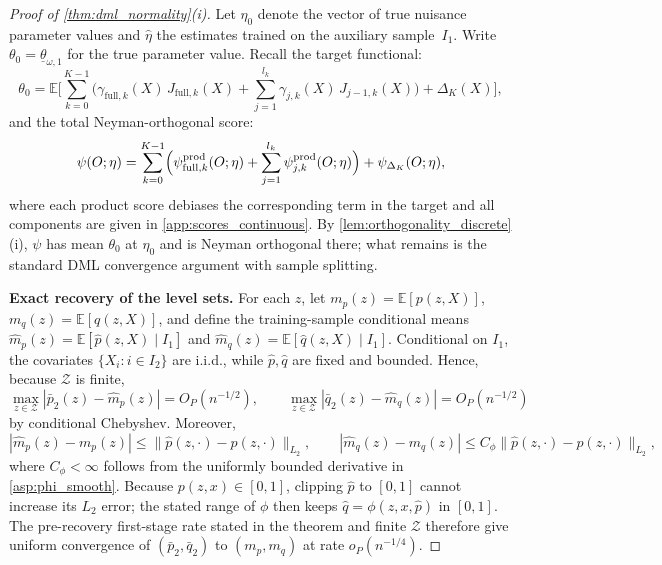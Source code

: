 \begin{proof}[Proof of \cref{thm:dml_normality}\textup{(i)}]
Let $\eta_0$ denote the vector of true nuisance parameter values and $\hat{\eta}$ the estimates trained on the auxiliary sample~$I_1$. Write $\theta_0 = \underline{\theta}_{\omega,1}$ for the true parameter value. Recall the target functional:
\begin{equation*}
    \theta_0 = \mathbb{E}\Bigg[\sum_{k=0}^{K-1}\bigg(\gamma_{\mathrm{full},k}(X)\,J_{\mathrm{full},k}(X) + \sum_{j=1}^{l_k} \gamma_{j,k}(X)\,J_{j-1,k}(X)\bigg) + \Delta_K(X)\Bigg],
\end{equation*}
and the total Neyman-orthogonal score:
\begin{equation*}
    \psi(O;\eta) = \sum_{k=0}^{K-1}\Bigl(\psi_{\mathrm{full},k}^{\mathrm{prod}}(O;\eta) + \sum_{j=1}^{l_k}\psi_{j,k}^{\mathrm{prod}}(O;\eta)\Bigr) + \psi_{\Delta_K}(O;\eta),
\end{equation*}
where each product score debiases the corresponding term in the target and all components are given in \cref{app:scores_continuous}. By \cref{lem:orthogonality_discrete}\textup{(i)}, $\psi$ has mean $\theta_0$ at $\eta_0$ and is Neyman orthogonal there; what remains is the standard DML convergence argument with sample splitting.

\medskip
\noindent\textbf{Exact recovery of the level sets.}
For each $z$, let $m_p(z)=\mathbb E[p(z,X)]$, $m_q(z)=\mathbb E[q(z,X)]$, and define the training-sample conditional means $\hat m_p(z)=\mathbb E[\hat p(z,X)\mid I_1]$ and $\hat m_q(z)=\mathbb E[\hat q(z,X)\mid I_1]$. Conditional on $I_1$, the covariates $\{X_i:i\in I_2\}$ are i.i.d., while $\hat p,\hat q$ are fixed and bounded. Hence, because $\mathcal Z$ is finite,
\[
    \max_{z\in\mathcal Z}|\bar p_2(z)-\hat m_p(z)|=O_P(n^{-1/2}),
    \qquad
    \max_{z\in\mathcal Z}|\bar q_2(z)-\hat m_q(z)|=O_P(n^{-1/2})
\]
by conditional Chebyshev. Moreover,
\[
    |\hat m_p(z)-m_p(z)|
    \le \|\hat p(z,\cdot)-p(z,\cdot)\|_{L_2},
    \qquad
    |\hat m_q(z)-m_q(z)|
    \le C_\phi\|\hat p(z,\cdot)-p(z,\cdot)\|_{L_2},
\]
where $C_\phi<\infty$ follows from the uniformly bounded derivative in \cref{asp:phi_smooth}. Because $p(z,x)\in[0,1]$, clipping $\hat p$ to $[0,1]$ cannot increase its $L_2$ error; the stated range of $\phi$ then keeps $\hat q=\phi(z,x,\hat p)$ in $[0,1]$. The pre-recovery first-stage rate stated in the theorem and finite $\mathcal Z$ therefore give uniform convergence of $(\bar p_2,\bar q_2)$ to $(m_p,m_q)$ at rate $o_P(n^{-1/4})$.


\end{proof}
